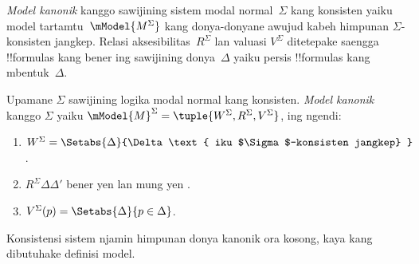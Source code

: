 \documentclass[../../../include/open-logic-section]{subfiles}
\begin{document}


\emph{Model kanonik} kanggo sawijining sistem modal normal~$\Sigma$ kang konsisten yaiku
model tartamtu~$\mModel{M^\Sigma}$ kang donya-donyane awujud kabeh
himpunan $\Sigma$-konsisten jangkep. Relasi aksesibilitas~$R^\Sigma$
lan valuasi $V^\Sigma$ ditetepake saengga !!{formula}s kang bener ing
sawijining donya~$\Delta$ yaiku persis !!{formula}s kang mbentuk~$\Delta$.

\begin{defn}
  Upamane $\Sigma$ sawijining logika modal normal kang konsisten. \emph{Model kanonik}
  kanggo $\Sigma$ yaiku $\mModel{M}^\Sigma = \tuple{W^\Sigma, R^\Sigma,
    V^\Sigma}$, ing ngendi:
  \begin{enumerate}
  \item $W^\Sigma = \Setabs{ \Delta }{\Delta \text{
      iku $\Sigma$-konsisten jangkep} }$.
  \item $R^\Sigma \Delta\Delta'$ bener yen lan mung yen
    .
  \item $V^\Sigma(p) = \Setabs{\Delta}{p \in \Delta}$.
  \end{enumerate}
Konsistensi sistem njamin himpunan donya kanonik ora kosong, kaya kang dibutuhake definisi model.
\end{defn}
\end{document}
